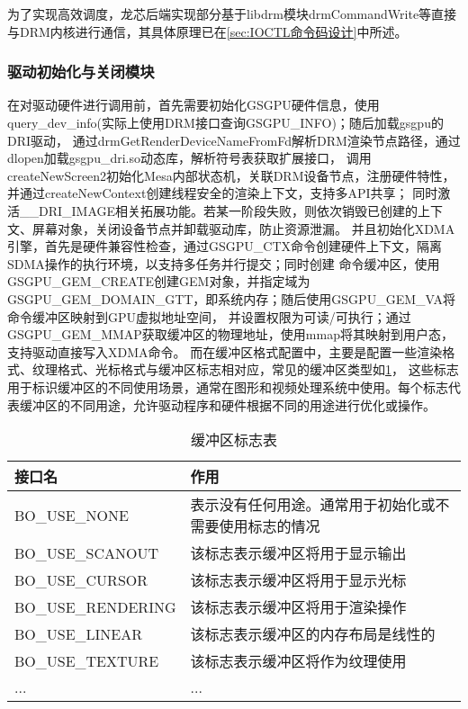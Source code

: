 为了实现高效调度，龙芯后端实现部分基于libdrm模块drmCommandWrite等直接与DRM内核进行通信，其具体原理已在\ref{sec:IOCTL命令码设计}中所述。

\subsubsection{驱动初始化与关闭模块}

在对驱动硬件进行调用前，首先需要初始化GSGPU硬件信息，使用query\_dev\_info(实际上使用DRM接口查询GSGPU\_INFO)；随后加载gsgpu的DRI驱动，
通过drmGetRenderDeviceNameFromFd解析DRM渲染节点路径，通过dlopen加载gsgpu\_dri.so动态库，解析符号表获取扩展接口，
调用createNewScreen2初始化Mesa内部状态机，关联DRM设备节点，注册硬件特性，并通过createNewContext创建线程安全的渲染上下文，支持多API共享；
同时激活\_\_DRI\_IMAGE相关拓展功能。若某一阶段失败，则依次销毁已创建的上下文、屏幕对象，关闭设备节点并卸载驱动库，防止资源泄漏。
并且初始化XDMA引擎，首先是硬件兼容性检查，通过GSGPU\_CTX命令创建硬件上下文，隔离SDMA操作的执行环境，以支持多任务并行提交；同时创建
命令缓冲区，使用GSGPU\_GEM\_CREATE创建GEM对象，并指定域为GSGPU\_GEM\_DOMAIN\_GTT，即系统内存；随后使用GSGPU\_GEM\_VA将命令缓冲区映射到GPU虚拟地址空间，
并设置权限为可读/可执行；通过GSGPU\_GEM\_MMAP获取缓冲区的物理地址，使用mmap将其映射到用户态，支持驱动直接写入XDMA命令。
而在缓冲区格式配置中，主要是配置一些渲染格式、纹理格式、光标格式与缓冲区标志相对应，常见的缓冲区类型如\ref{tab:缓冲区标志表}，
这些标志用于标识缓冲区的不同使用场景，通常在图形和视频处理系统中使用。每个标志代表缓冲区的不同用途，允许驱动程序和硬件根据不同的用途进行优化或操作。

\begin{table}[H]  
  \centering
  \caption{缓冲区标志表}
  \label{tab:缓冲区标志表}
  \begin{tabular}{ll}
    \toprule
    接口名  & 作用\\
    \midrule
    BO\_USE\_NONE & 表示没有任何用途。通常用于初始化或不需要使用标志的情况 \\
    BO\_USE\_SCANOUT & 该标志表示缓冲区将用于显示输出 \\
    BO\_USE\_CURSOR & 该标志表示缓冲区将用于显示光标 \\
    BO\_USE\_RENDERING & 该标志表示缓冲区将用于渲染操作 \\
    BO\_USE\_LINEAR & 该标志表示缓冲区的内存布局是线性的 \\
    BO\_USE\_TEXTURE & 该标志表示缓冲区将作为纹理使用 \\
    ... & ... \\
    \bottomrule
  \end{tabular}
  \note{}
\end{table}

